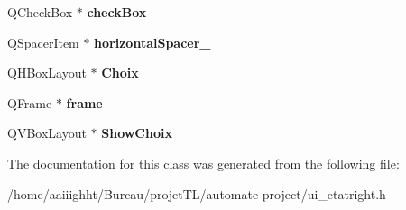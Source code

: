 \begin{DoxyCompactItemize}
\item 
\hypertarget{class_ui__etat_right_ac9820c9b342d98aeb7628006d3680f8d}{Q\-Check\-Box $\ast$ {\bfseries check\-Box}}\label{class_ui__etat_right_ac9820c9b342d98aeb7628006d3680f8d}

\item 
\hypertarget{class_ui__etat_right_a70927b9537c904c9b08375b7b16f602a}{Q\-Spacer\-Item $\ast$ {\bfseries horizontal\-Spacer\-\_}}\label{class_ui__etat_right_a70927b9537c904c9b08375b7b16f602a}

\item 
\hypertarget{class_ui__etat_right_a84fbc71af2dbce7ba9c121d3c8efb806}{Q\-H\-Box\-Layout $\ast$ {\bfseries Choix}}\label{class_ui__etat_right_a84fbc71af2dbce7ba9c121d3c8efb806}

\item 
\hypertarget{class_ui__etat_right_a6b6dd7a6a049e9eb6d6fcd25b4075830}{Q\-Frame $\ast$ {\bfseries frame}}\label{class_ui__etat_right_a6b6dd7a6a049e9eb6d6fcd25b4075830}

\item 
\hypertarget{class_ui__etat_right_a676317a105e9b63305fef82b234bba36}{Q\-V\-Box\-Layout $\ast$ {\bfseries Show\-Choix}}\label{class_ui__etat_right_a676317a105e9b63305fef82b234bba36}

\end{DoxyCompactItemize}


The documentation for this class was generated from the following file\-:\begin{DoxyCompactItemize}
\item 
/home/aaiiighht/\-Bureau/projet\-T\-L/automate-\/project/ui\-\_\-etatright.\-h\end{DoxyCompactItemize}

